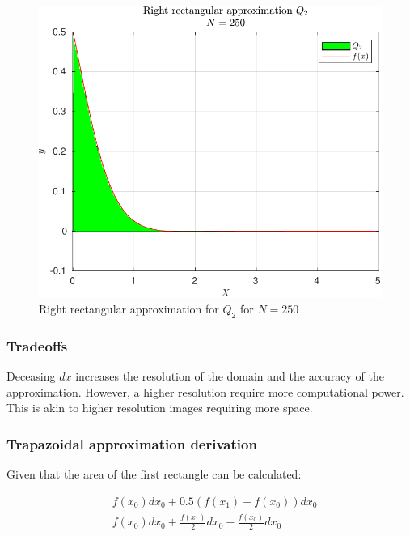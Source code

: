 \documentclass[12pt]{article}
\begin{document}
				\begin{figure}[H]
					\centering
					\includegraphics[width=1\linewidth]{Code/Fig/q2_bar_plot_250.pdf}
					\caption{\Large Right rectangular approximation for $Q_{2}$ for $N = 250$}
					\label{fig:q2barplot250}
				\end{figure}	
						
			\subsubsection{Tradeoffs}
			Deceasing $dx$ increases the resolution of the domain and the accuracy of the approximation. However, a higher resolution require more computational power. This is akin to higher resolution images requiring more space.
			\newpage
			\subsubsection{Trapazoidal approximation derivation}
				Given that the area of the first rectangle can be calculated:
				
				$$
				\begin{aligned}
					& f\left(x_{0}\right) d x_{0}+0.5\left(f\left(x_{1}\right)-f\left(x_{0}\right)\right) d x_{0} \\
					& f\left(x_{0}\right) d x_{0}+\frac{f\left(x_{1}\right)}{2} d x_{0}-\frac{f\left(x_{0}\right)}{2} d x_{0}
				\end{aligned}
				$$
				
\end{document}
